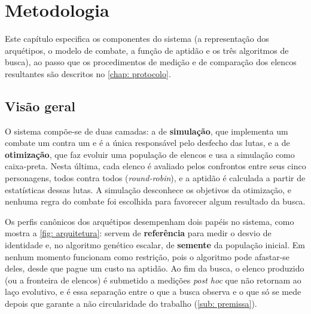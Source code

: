 \chapter[Metodologia]{Metodologia}
\label{chap: metodologia}

Este capítulo especifica os componentes do sistema (a representação dos arquétipos, o modelo de combate, a função de aptidão e os três algoritmos de busca), ao passo que os procedimentos de medição e de comparação dos elencos resultantes são descritos no \autoref{chap: protocolo}.

\section{Visão geral}
\label{sec: visao_geral}

O sistema compõe-se de duas camadas: a de \textbf{simulação}, que implementa um combate um contra um e é a única responsável pelo desfecho das lutas, e a de \textbf{otimização}, que faz evoluir uma população de elencos e usa a simulação como caixa-preta. Nesta última, cada elenco é avaliado pelos confrontos entre seus cinco personagens, todos contra todos (\textit{round-robin}), e a aptidão é calculada a partir de estatísticas dessas lutas. A simulação desconhece os objetivos da otimização, e nenhuma regra do combate foi escolhida para favorecer algum resultado da busca.

Os perfis canônicos dos arquétipos desempenham dois papéis no sistema, como mostra a \autoref{fig: arquitetura}: servem de \textbf{referência} para medir o desvio de identidade e, no algoritmo genético escalar, de \textbf{semente} da população inicial. Em nenhum momento funcionam como restrição, pois o algoritmo pode afastar-se deles, desde que pague um custo na aptidão. Ao fim da busca, o elenco produzido (ou a fronteira de elencos) é submetido a medições \textit{post hoc} que não retornam ao laço evolutivo, e é essa separação entre o que a busca observa e o que só se mede depois que garante a não circularidade do trabalho (\autoref{sub: premissa}).

